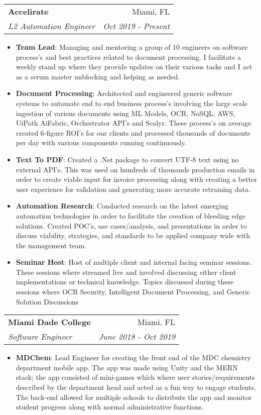\documentclass[letterpaper,11pt]{article}
\makeatletter
\newcommand{\resumeItem}[2]{
  \item\small{
    \textbf{#1}{: #2 \vspace{-2pt}}
  }
}
\newcommand{\resumeSubheading}[4]{
  \vspace{-1pt}\item
    \begin{tabular*}{0.97\textwidth}{l@{\extracolsep{\fill}}r}
      \textbf{#1} & #2 \\
      \textit{\small#3} & \textit{\small #4} \\
    \end{tabular*}\vspace{-5pt}
}
\newcommand{\resumeItemListStart}{\begin{itemize}}
\newcommand{\resumeItemListEnd}{\end{itemize}\vspace{-5pt}}
\makeatother
\begin{document}
    \resumeSubheading
      {Accelirate}{Miami, FL}
      {L2 Automation Engineer}{Oct 2019 - Present}
      \resumeItemListStart
        \resumeItem{Team Lead}
          {Managing and mentoring a group of 10 engineers on software process's and best practices related to document processing. I facilitate a weekly stand up where they provide updates on their various tasks and I act as a scrum master unblocking and helping as needed.}
        \resumeItem{Document Processing}
          {Architected and engineered generic software systems to automate end to end business process's involving the large scale ingestion of various documents using ML Models, OCR, NoSQL, AWS, UiPath AiFabric, Orchestrator API's and Scalyr. These process's on average created 6-figure ROI's for our clients and processed thousands of documents per day with various components running continuously.}
          \resumeItem{Text To PDF}
          {Created a .Net package to convert UTF-8 text using no external API's. This was used on hundreds of thousands production emails in order to create viable input for invoice processing along with creating a better user experience for validation and generating more accurate retraining data.}
        \resumeItem{Automation Research}
          {Conducted research on the latest emerging automation technologies in order to facilitate the creation of bleeding edge solutions. Created POC's, use cases/analysis, and presentations in order to discuss viability, strategies, and standards to be applied company wide with the management team.}
        \resumeItem{Seminar Host}
          {Host of multiple client and internal facing seminar sessions. These sessions where streamed live and involved discussing either client implementations or technical knowledge. Topics discussed during these sessions where OCR Security, Intelligent Document Processing, and Generic Solution Discussions}
      \resumeItemListEnd

    \resumeSubheading
      {Miami Dade College}{Miami, FL}
      {Software Engineer}{June 2018 - Oct 2019}
      \resumeItemListStart
        \resumeItem{MDChem}
          {Lead Engineer for creating the front end of the MDC chemistry department mobile app. The app was made using Unity and the MERN stack; the app consisted of mini-games which where user stories/requirements described by the department head and acted as a fun way to engage students. The back-end allowed for multiple schools to distribute the app and monitor student progress along with normal administrative functions.}
      \resumeItemListEnd
\end{document}
